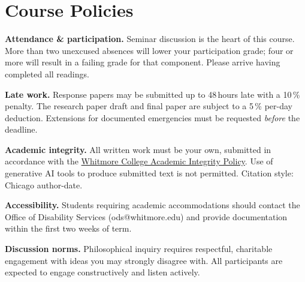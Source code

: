 \section{Course Policies}

\textbf{Attendance \& participation.}
Seminar discussion is the heart of this course. More than two unexcused absences will lower your
participation grade; four or more will result in a failing grade for that component.
Please arrive having completed all readings.

\textbf{Late work.}
Response papers may be submitted up to 48\,hours late with a 10\,\% penalty. The research
paper draft and final paper are subject to a 5\,\% per-day deduction. Extensions for
documented emergencies must be requested \emph{before} the deadline.

\textbf{Academic integrity.}
All written work must be your own, submitted in accordance with the \href{https://whitmore.edu/integrity}{Whitmore College Academic Integrity Policy}.
Use of generative AI tools to produce submitted text is not permitted. Citation style:
Chicago author-date.

\textbf{Accessibility.}
Students requiring academic accommodations should contact the Office of Disability Services
(ods@whitmore.edu) and provide documentation within the first two weeks of term.

\textbf{Discussion norms.}
Philosophical inquiry requires respectful, charitable engagement with ideas you may strongly
disagree with. All participants are expected to engage constructively and listen actively.

